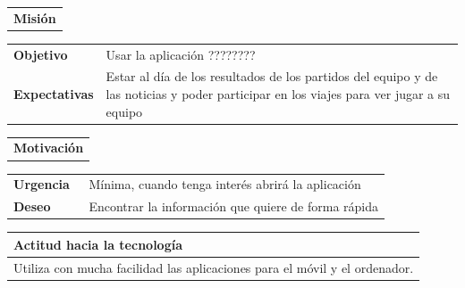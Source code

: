 \documentclass[11pt]{article}
\begin{document}
\begin{table}[H]
  \begin{tabular}{l}
    \textbf{Misión} 
  \end{tabular}
  
  \begin{tabular}{p{0.2\linewidth}|p{0.8\linewidth}}
    \toprule
    \textbf{Objetivo} & Usar la aplicación ????????\\
    \textbf{Expectativas}  & Estar al día de los resultados de los partidos del equipo y de las noticias y poder participar en los viajes para ver jugar a su equipo\\
    \bottomrule
  \end{tabular}

  \begin{tabular}{l}
    \textbf{Motivación} 
  \end{tabular}

  \begin{tabular}{p{0.2\linewidth}|p{0.8\linewidth}}
    \toprule
    \textbf{Urgencia} & Mínima, cuando tenga interés abrirá la aplicación\\
    \textbf{Deseo}  & Encontrar la información que quiere de forma rápida \\
    \bottomrule
  \end{tabular}

  \begin{tabular}{p{1.028\linewidth}}
    \textbf{Actitud hacia la tecnología}\\
    \midrule
    Utiliza con mucha facilidad las aplicaciones para el móvil y el ordenador.
  \end{tabular}
\end{table}
\end{document}
